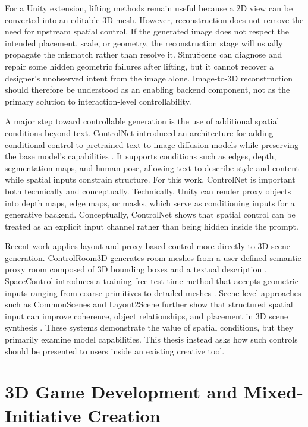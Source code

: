 \documentclass[11pt]{report}
\begin{document}
For a Unity extension, lifting methods remain useful because a 2D view can be converted into an editable 3D mesh. However, reconstruction does not remove the need for upstream spatial control. If the generated image does not respect the intended placement, scale, or geometry, the reconstruction stage will usually propagate the mismatch rather than resolve it. SimuScene can diagnose and repair some hidden geometric failures after lifting, but it cannot recover a designer's unobserved intent from the image alone. Image-to-3D reconstruction should therefore be understood as an enabling backend component, not as the primary solution to interaction-level controllability.

A major step toward controllable generation is the use of additional spatial conditions beyond text. ControlNet introduced an architecture for adding conditional control to pretrained text-to-image diffusion models while preserving the base model's capabilities \cite{zhang2023controlnet}. It supports conditions such as edges, depth, segmentation maps, and human pose, allowing text to describe style and content while spatial inputs constrain structure. For this work, ControlNet is important both technically and conceptually. Technically, Unity can render proxy objects into depth maps, edge maps, or masks, which serve as conditioning inputs for a generative backend. Conceptually, ControlNet shows that spatial control can be treated as an explicit input channel rather than being hidden inside the prompt. 

Recent work applies layout and proxy-based control more directly to 3D scene generation. ControlRoom3D generates room meshes from a user-defined semantic proxy room composed of 3D bounding boxes and a textual description \cite{schult2024controlroom3d}. SpaceControl introduces a training-free test-time method that accepts geometric inputs ranging from coarse primitives to detailed meshes \cite{fedele2025spacecontrol}. Scene-level approaches such as CommonScenes and Layout2Scene further show that structured spatial input can improve coherence, object relationships, and placement in 3D scene synthesis \cite{zhai2023commonscenes, chen2025layout2scene}.  These systems demonstrate the value of spatial conditions, but they primarily examine model capabilities. This thesis instead asks how such controls should be presented to users inside an existing creative tool.

\section{3D Game Development and Mixed-Initiative Creation}
\label{sec:rw-game-workflows}
\end{document}
